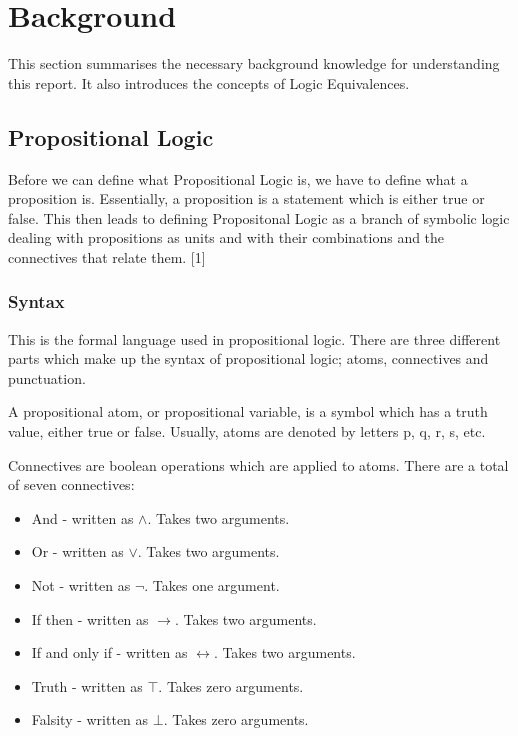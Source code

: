 \documentclass{report}
\begin{document}

\chapter{Background} %

This section summarises the necessary background knowledge for understanding
this report. It also introduces the concepts of Logic Equivalences.

\section{Propositional Logic}
Before we can define what Propositional Logic is, we have to define what a 
proposition is. Essentially, a proposition is a statement which is either
true or false. This then leads to defining Propositonal Logic as a branch of
symbolic logic dealing with propositions as units and with their combinations
and the connectives that relate them. [1]

\subsection{Syntax}
This is the formal language used in propositional logic. There are three different
parts which make up the syntax of propositional logic; atoms, connectives and
punctuation.

A propositional atom, or propositional variable, is a symbol which has a truth
value, either true or false. Usually, atoms are denoted by letters p, q, r, s, etc.

Connectives are boolean operations which are applied to atoms. There are a total
of seven connectives:

\begin{itemize}
	\item And - written as $\land$. Takes two arguments.
	\item Or - written as $\lor$. Takes two arguments.
	\item Not - written as $\neg$. Takes one argument.
	\item If then - written as $\to$. Takes two arguments.
	\item If and only if - written as $\leftrightarrow$. Takes two arguments.
	\item Truth - written as $\top$. Takes zero arguments.
	\item Falsity - written as $\bot$. Takes zero arguments.
\end{itemize}
\end{document}
